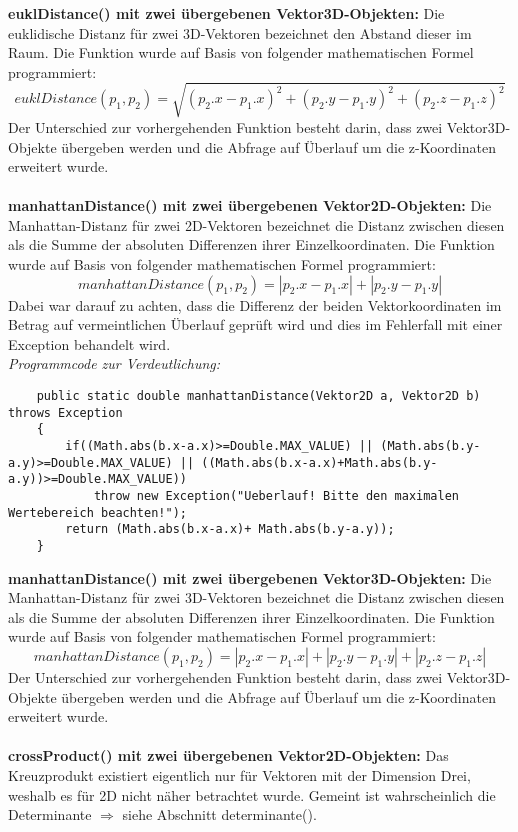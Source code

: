 \documentclass[a4paper,11pt]{scrartcl}
\begin{document}
\textbf{euklDistance() mit zwei übergebenen Vektor3D-Objekten:} Die euklidische Distanz für zwei 3D-Vektoren bezeichnet den Abstand dieser im Raum. Die Funktion wurde auf Basis von folgender mathematischen Formel programmiert:
\[ euklDistance(p_1,p_2) = \sqrt{(p_2.x - p_1.x)^2 + (p_2.y - p_1.y)^2 + (p_2.z - p_1.z)^2} \]
Der Unterschied zur vorhergehenden Funktion besteht darin, dass zwei Vektor3D-Objekte übergeben werden und die Abfrage auf Überlauf um die z-Koordinaten erweitert wurde.\\
\\
\textbf{manhattanDistance() mit zwei übergebenen Vektor2D-Objekten:} Die Manhattan-Distanz für zwei 2D-Vektoren bezeichnet die Distanz zwischen diesen als die Summe der absoluten Differenzen ihrer Einzelkoordinaten. Die Funktion wurde auf Basis von folgender mathematischen Formel programmiert:
\[ manhattanDistance(p_1,p_2) = | p_2.x - p_1.x | + | p_2.y - p_1.y | \]
Dabei war darauf zu achten, dass die Differenz der beiden Vektorkoordinaten im Betrag auf vermeintlichen Überlauf geprüft wird und dies im Fehlerfall mit einer Exception behandelt wird.\\
\textit{Programmcode zur Verdeutlichung:}
\begin{lstlisting}
	public static double manhattanDistance(Vektor2D a, Vektor2D b) throws Exception
	{
		if((Math.abs(b.x-a.x)>=Double.MAX_VALUE) || (Math.abs(b.y-a.y)>=Double.MAX_VALUE) || ((Math.abs(b.x-a.x)+Math.abs(b.y-a.y))>=Double.MAX_VALUE))
			throw new Exception("Ueberlauf! Bitte den maximalen Wertebereich beachten!");
		return (Math.abs(b.x-a.x)+ Math.abs(b.y-a.y));
	}
\end{lstlisting} $\;$ \\
\textbf{manhattanDistance() mit zwei übergebenen Vektor3D-Objekten:} Die Manhattan-Distanz für zwei 3D-Vektoren bezeichnet die Distanz zwischen diesen als die Summe der absoluten Differenzen ihrer Einzelkoordinaten. Die Funktion wurde auf Basis von folgender mathematischen Formel programmiert:
\[ manhattanDistance(p_1,p_2) = | p_2.x - p_1.x | + | p_2.y - p_1.y | + | p_2.z - p_1.z |\]
Der Unterschied zur vorhergehenden Funktion besteht darin, dass zwei Vektor3D-Objekte übergeben werden und die Abfrage auf Überlauf um die z-Koordinaten erweitert wurde.\\
\\
\textbf{crossProduct() mit zwei übergebenen Vektor2D-Objekten:} Das Kreuzprodukt existiert eigentlich nur für Vektoren mit der Dimension Drei, weshalb es für 2D nicht näher betrachtet wurde. Gemeint ist wahrscheinlich die Determinante $\Rightarrow$ siehe Abschnitt determinante().\\ 
\end{document}
